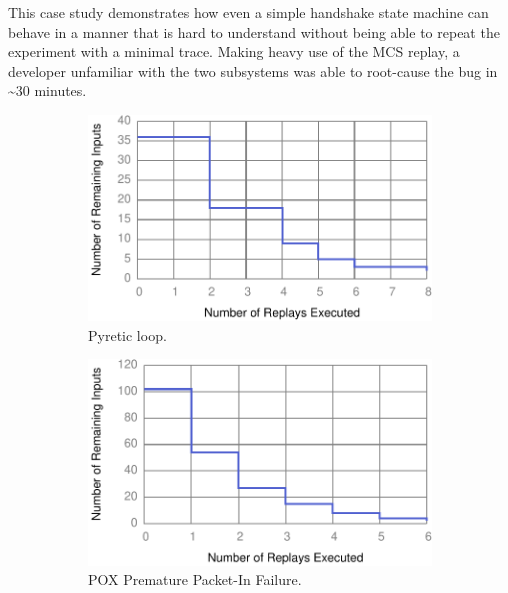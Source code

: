 This case study demonstrates how even a simple handshake state machine can
behave in a manner that is hard to understand
without being able to repeat the experiment with a minimal trace. Making heavy
use of the MCS replay, a developer unfamiliar with the two subsystems
was able to root-cause the bug in \textasciitilde30 minutes.
\begin{figure}[!htb]
\begin{subfigure}{0.33\textwidth}
    \includegraphics[width=\textwidth]{../graphs/runtime/pyretic_loop.pdf}
    \caption[]{\label{fig:pyretic_loop} Pyretic loop.}
\end{subfigure}\hfill
\begin{subfigure}{0.33\textwidth}
    \includegraphics[width=\textwidth]{../graphs/runtime/pox_early_packetin.pdf}
    \caption[]{\label{fig:pox_handshake} POX Premature Packet-In Failure.}
\end{subfigure}\hfill
\begin{subfigure}{0.33\textwidth}

\end{subfigure}
\end{figure}
